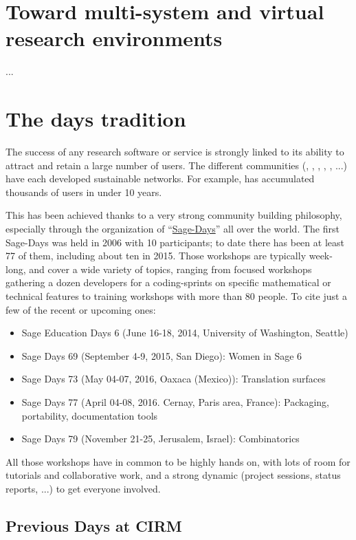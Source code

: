 \documentclass[12pt]{amsbook}
\begin{document}
\section{Toward multi-system and virtual research environments}

...

\section{The \Sage days tradition}

The success of any research software or service is strongly linked to
its ability to attract and retain a large number of users. The
different communities (\Sage, \GAP, \Pari, \Singular, \Jupyter, ...)
have each developed sustainable networks. For example, \Sage has
accumulated thousands of users in under 10 years.

This has been achieved thanks to a very strong community building
philosophy, especially through the organization of
“\href{https://wiki.sagemath.org/Workshops}{Sage-Days}” all over the
world. The first Sage-Days was held in 2006 with 10 participants; to
date there has been at least 77 of them, including about ten in
2015. Those workshops are typically week-long, and cover a wide
variety of topics, ranging from focused workshops gathering a dozen
developers for a coding-sprints on specific mathematical or technical
features to training workshops with more than 80 people. To cite just
a few of the recent or upcoming ones:

\begin{itemize}
\item Sage Education Days 6 (June 16-18, 2014, University of
  Washington, Seattle)
\item Sage Days 69 (September 4-9, 2015, San Diego): Women in Sage 6
\item Sage Days 73 (May 04-07, 2016, Oaxaca (Mexico)): Translation surfaces
\item Sage Days 77 (April 04-08, 2016. Cernay, Paris area, France):
  Packaging, portability, documentation tools
\item Sage Days 79 (November 21-25, Jerusalem, Israel): Combinatorics
\end{itemize}

All those workshops have in common to be highly hands on, with lots of
room for tutorials and collaborative work, and a strong dynamic
(project sessions, status reports, ...) to get everyone involved.

\subsection{Previous \Sage Days at CIRM}
\end{document}
